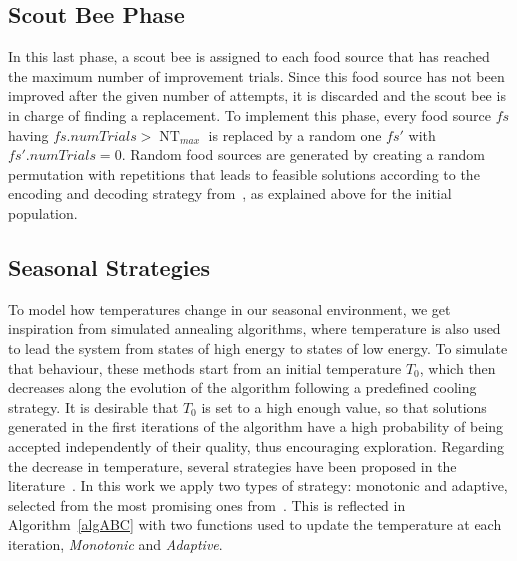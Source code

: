 \documentclass[icae]{iosart2x}
\newcommand{\reviewed}[1]{#1} %
\begin{document}
\subsection{Scout Bee Phase}\label{subsec:Scout}
In this last phase, a scout bee is assigned to each food source that has reached the maximum number of improvement trials. Since this food source has not been improved after the given number of attempts, it is discarded and the scout bee is in charge of finding a replacement. To implement this phase, every food source $\mathit{fs}$ having {$\mathit{fs.numTrials} > \operatorname{NT}_{max}$} is replaced by a random one $\mathit{fs'}$ with $\mathit{fs'.numTrials} = 0$. \reviewed{Random food sources are generated by creating a random permutation with repetitions that leads to feasible solutions according to the encoding and decoding strategy from~\cite{Diaz2020genetic}, as explained above for the initial population.}

\subsection{Seasonal Strategies}\label{subsecCoolingSchedules}

To model how temperatures change in our seasonal environment, we get inspiration from simulated annealing algorithms, where temperature is also used to lead the system from states of high energy to states of low energy. To simulate that behaviour, these methods start from an initial temperature $T_0$, which then decreases along the evolution of the algorithm following a predefined cooling strategy. It is desirable that $T_0$ is set to a high enough value, so that solutions generated in the first iterations of the algorithm have a high probability of being accepted independently of their quality, thus encouraging exploration. Regarding the decrease in temperature, several strategies have been proposed in the literature~\cite{VanLaarhoven1992,Locatelli2000,Siddique2016b}. In this work \reviewed{we apply two types of strategy: monotonic and adaptive, selected from the most promising ones from~\cite{DiazMartin2009}. This is reflected in Algorithm~\ref{algABC} with two functions used to update the temperature at each iteration,  \textit{Monotonic} and \textit{Adaptive}.}
\end{document}
